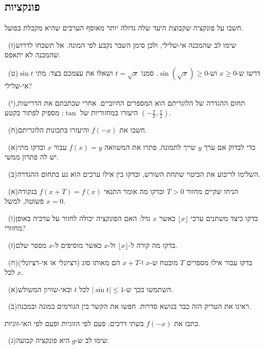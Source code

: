 \documentclass[12pt, a4paper]{article}
\begin{document}
\subsection*{פונקציות}
\noindent {}\enskip חשבו על פונקציה שקבוצת היעד שלה גדולה יותר מאוסף הערכים שהיא מקבלת בפועל.\par\smallskip
\noindent {}\ (ז)\enskip שימו לב שהמכנה אי-שלילי, ולכן סימן השבר נקבע לפי המונה. אל תשכחו לדרוש שהמכנה לא יתאפס.\par\smallskip
\noindent {}\ (ט)\enskip דרשו ש-$x\geq0$ וש-$\sin(\sqrt x)\geq0$. סמנו $t=\sqrt x$ ושאלו את עצמכם בצד: מתי $\sin t$ אי-שלילי?\par\smallskip
\noindent {}\ (י)\enskip תחום ההגדרה של הלוגריתם הוא המספרים החיוביים. אחרי שכתבתם את הדרישות, היעזרו במחזוריות של $\tan$: מספיק לפתור בקטע $(-\frac{\pi}{2},\frac{\pi}{2})$.\par\smallskip
\noindent {}\ (ח)\enskip חשבו את $f(-x)$ והיעזרו בתכונות הלוגריתם.\par\smallskip
\noindent {}\ (א)\enskip כדי לבדוק אם ערך $y$ שייך לתמונה, פתרו את המשוואה $f(x)=y$ עבור $x$ ובדקו מתי יש לה פתרון ממשי.\par\smallskip
\noindent {}\ (ב)\enskip השלימו לריבוע את הביטוי שתחת השורש, ובדקו בין אילו ערכים הוא נע בתחום ההגדרה.\par\smallskip
\noindent {}\ (א)\enskip הניחו שקיים מחזור $T>0$ ובדקו מה אומר התנאי $f(x+T)=f(x)$ בנקודה פשוטה, למשל $x=0$.\par\smallskip
\noindent {}\ (ו)\enskip בדקו כיצד משתנים ערכי $\lfloor x\rfloor$ כאשר $x$ גדל: האם הפונקציה יכולה לחזור על ערכיה באופן מחזורי?\par\smallskip
\noindent {}\ (ז)\enskip בדקו מה קורה ל-$\lfloor x\rfloor$ ול-$x$ כאשר מוסיפים ל-$x$ מספר שלם.\par\smallskip
\noindent {}\ (ח)\enskip בדקו עבור אילו מספרים $T$ מובטח ש-$x$ ו-$x+T$ הם מאותו סוג (רציונלי או אי-רציונלי) לכל $x$.\par\smallskip
\noindent {}\ (א)\enskip השתמשו בכך ש-$|\sin t|\leq1$ לכל $t$ ובאי-שוויון המשולש.\par\smallskip
\noindent {}\ (ב)\enskip ראינו את הטריק הזה כבר בנושא סדרות. חפשו את הקשר בין הגורמים במונה ובמכנה.\par\smallskip
\noindent {}\enskip כתבו את $f(-x)$ בשתי דרכים: פעם לפי הזוגיות ופעם לפי האי-זוגיות.\par\smallskip
\noindent {}\ (ג)\enskip שימו לב ש-$g$ היא פונקציה קבועה.\par\smallskip
\end{document}
